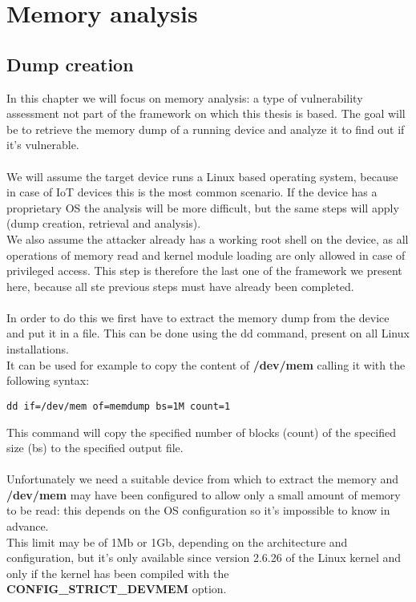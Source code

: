 \chapter{Memory analysis}
\section{Dump creation}
In this chapter we will focus on memory analysis: a type of vulnerability assessment not part of the framework on which
this thesis is based. The goal will be to retrieve the memory dump of a running device
and analyze it to find out if it's vulnerable.\\\\
We will assume the target device runs a Linux based operating system, because
in case of IoT devices this is the most common scenario. If the device has a
proprietary OS the analysis will be more difficult, but the same steps will apply
(dump creation, retrieval and analysis).\\
We also assume the attacker already has a working root shell on the device,
as all operations of memory read and kernel module loading are only allowed in
case of privileged access. This step is therefore the last one
of the framework we present here, because all ste previous steps
must have already been completed.\\\\
In order to do this we first have to extract the memory dump from the device
and put it in a file. This can be done using the dd command, present on all
Linux installations.\\ It can be used for example to copy the content of \textbf{/dev/mem}
calling it with the following syntax:
\begin{lstlisting}[numbers=none]
    dd if=/dev/mem of=memdump bs=1M count=1
\end{lstlisting}
This command will copy the specified number of blocks (count) of the specified
size (bs) to the specified output file.\\\\
Unfortunately we need a suitable device from which to extract the memory and \textbf{/dev/mem}
may have been configured to allow only a small amount of memory to be read:
this depends on the OS configuration so it's impossible to know in advance.\\
This limit may be of 1Mb or 1Gb, depending on the architecture and configuration, but it's only
available since version 2.6.26 of the Linux kernel\cite{dev-mem-man} and only
if the kernel has been compiled with the \textbf{CONFIG\_STRICT\_DEVMEM} option.\\
